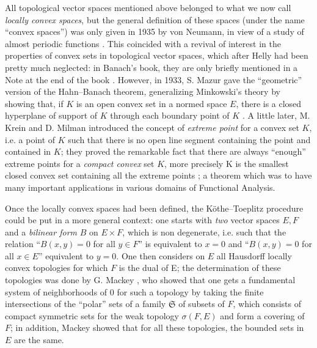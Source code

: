 \documentclass[12pt,a4paper,leqno,twoside]{extbook}
\begin{document}
All topological vector spaces mentioned above belonged to what we now call \emph{locally convex spaces}, but the general definition of these spaces (under the name ``convex spaces'') was only given in 1935 by von Neumann, in view of a study of almost periodic functions \cite[vol.~II, p.~508--527]{221}. This coincided with a revival of interest in the properties of convex sets in topological vector spaces, which after Helly had been pretty much neglected: in Banach's book, they are only briefly mentioned in a Note at the end of the book \cite[p.~246]{015}. However, in 1933, S. Mazur gave the ``geometric'' version of the Hahn--Banach theorem, generalizing Minkowski's theory by showing that, if \(K\) is an open convex set in a normed space \(E\), there is a closed hyperplane of support of \(K\) through each boundary point of \(K\) \cite{158}. A little later, M. Krein and D. Milman introduced the concept of \emph{extreme point} for a convex set \(K\), i.e. a point of \(K\) such that there is no open line segment containing the point and contained in \(K\); they proved the remarkable fact that there are always ``enough'' extreme points for a \emph{compact convex} set \(K\), more precisely K is the smallest closed convex set containing all the extreme points \cite{131}; a theorem which was to have many important applications in various domains of Functional Analysis.

Once the locally convex spaces had been defined, the Köthe--Toeplitz procedure could be put in a more general context: one starts with \emph{two} vector spaces \(E, F\) and a \emph{bilinear form} \(B\) on \(E \times F\), which is non degenerate, i.e. such that the relation ``\(B(x,y) = 0\) for all \(y \in F\)'' is equivalent to \(x = 0\) and ``\(B(x,y) = 0\) for all \(x \in E\)'' equivalent to \(y = 0\). One then considers on \(E\) all Hausdorff locally convex topologies for which \(F\) is the dual of E; the determination of these topologies was done by G. Mackey \cite{154}, who showed that one gets a fundamental system of neighborhoods of 0 for such a topology by taking the finite intersections of the ``polar'' sets of a family \(\mathfrak{S}\) of subsets of \(F\), which consists of compact symmetric sets for the weak topology \(\sigma(F,E)\) and form a covering of \(F\); in addition, Mackey showed that for all these topologies, the bounded sets in \(E\) are the same.
\end{document}
